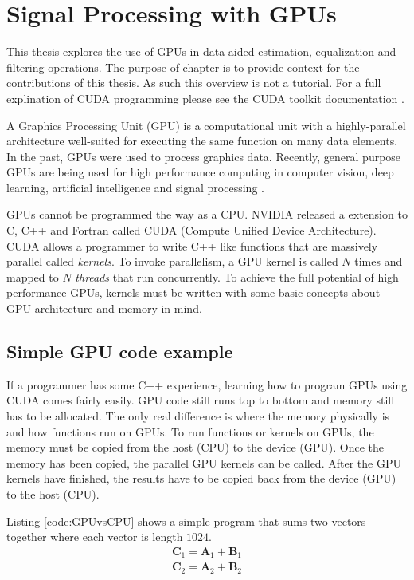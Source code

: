 \chapter{Signal Processing with GPUs}
\label{chap:gpu}

This thesis explores the use of GPUs in data-aided estimation, equalization and filtering operations.
The purpose of chapter is to provide context for the contributions of this thesis.
As such this overview is not a tutorial.
For a full explination of CUDA programming please see the CUDA toolkit documentation \cite{CUDA_toolkit_doc}.

A Graphics Processing Unit (GPU) is a computational unit with a highly-parallel architecture well-suited for executing the same function on many data elements.
In the past, GPUs were used to process graphics data.
Recently, general purpose GPUs are being used for high performance computing in computer vision, deep learning, artificial intelligence and signal processing \cite{wikipedia-gpu:2015}.

GPUs cannot be programmed the way as a CPU. 
NVIDIA released a extension to C, C++ and Fortran called CUDA (Compute Unified Device Architecture).
CUDA allows a programmer to write C++ like functions that are massively parallel called \textit{kernels}.
To invoke parallelism, a GPU kernel is called $N$ times and mapped to $N$ \textit{threads} that run concurrently.
To achieve the full potential of high performance GPUs, kernels must be written with some basic concepts about GPU architecture and memory in mind.

\section{Simple GPU code example}
If a programmer has some C++ experience, learning how to program GPUs using CUDA comes fairly easily.
GPU code still runs top to bottom and memory still has to be allocated.
The only real difference is where the memory physically is and how functions run on GPUs.
To run functions or kernels on GPUs, the memory must be copied from the host (CPU) to the device (GPU).
Once the memory has been copied, the parallel GPU kernels can be called.
After the GPU kernels have finished, the results have to be copied back from the device (GPU) to the host (CPU).

Listing \ref{code:GPUvsCPU} shows a simple program that sums two vectors together where each vector is length $1024$.
\begin{equation}
\begin{matrix}
\mathbf{C}_1 = \mathbf{A}_1 + \mathbf{B}_1 \\
\mathbf{C}_2 = \mathbf{A}_2 + \mathbf{B}_2
\end{matrix}
\end{equation}


